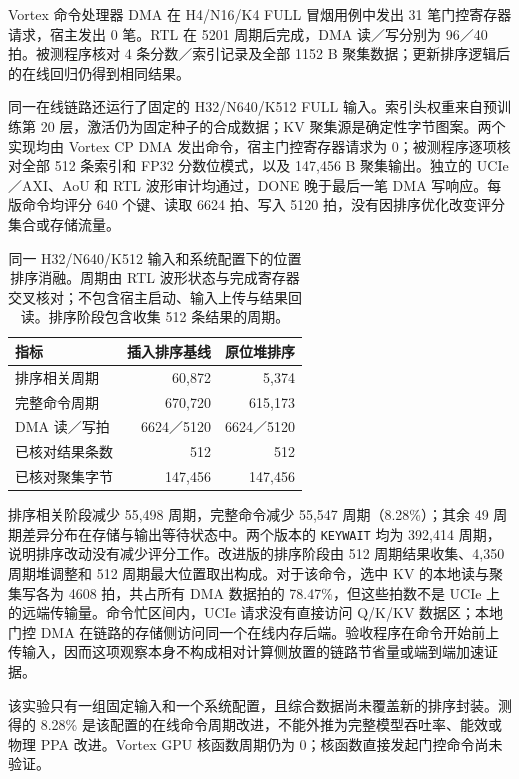 Vortex 命令处理器 DMA 在 H4/N16/K4 FULL 冒烟用例中发出 31 笔门控寄存器请求，宿主发出 0 笔。RTL 在 5201 周期后完成，DMA 读／写分别为 96／40 拍。被测程序核对 4 条分数／索引记录及全部 1152 B 聚集数据；更新排序逻辑后的在线回归仍得到相同结果。

同一在线链路还运行了固定的 H32/N640/K512 FULL 输入。索引头权重来自预训练第 20 层，激活仍为固定种子的合成数据；KV 聚集源是确定性字节图案。两个实现均由 Vortex CP DMA 发出命令，宿主门控寄存器请求为 0；被测程序逐项核对全部 512 条索引和 FP32 分数位模式，以及 147,456 B 聚集输出。独立的 UCIe／AXI、AoU 和 RTL 波形审计均通过，DONE 晚于最后一笔 DMA 写响应。每版命令均评分 640 个键、读取 6624 拍、写入 5120 拍，没有因排序优化改变评分集合或存储流量。

\begin{table}[t]
\centering
\caption{同一 H32/N640/K512 输入和系统配置下的位置排序消融。周期由 RTL 波形状态与完成寄存器交叉核对；不包含宿主启动、输入上传与结果回读。排序阶段包含收集 512 条结果的周期。}
\label{tab:sort_ablation}
\small
\begin{tabular}{lrr}\toprule
指标 & 插入排序基线 & 原位堆排序\\\midrule
排序相关周期 & 60,872 & 5,374\\
完整命令周期 & 670,720 & 615,173\\
DMA 读／写拍 & 6624／5120 & 6624／5120\\
已核对结果条数 & 512 & 512\\
已核对聚集字节 & 147,456 & 147,456\\\bottomrule
\end{tabular}
\end{table}

排序相关阶段减少 55,498 周期，完整命令减少 55,547 周期（8.28\%）；其余 49 周期差异分布在存储与输出等待状态中。两个版本的 \texttt{KEYWAIT} 均为 392,414 周期，说明排序改动没有减少评分工作。改进版的排序阶段由 512 周期结果收集、4,350 周期堆调整和 512 周期最大位置取出构成。对于该命令，选中 KV 的本地读与聚集写各为 4608 拍，共占所有 DMA 数据拍的 78.47\%，但这些拍数不是 UCIe 上的远端传输量。命令忙区间内，UCIe 请求没有直接访问 Q/K/KV 数据区；本地门控 DMA 在链路的存储侧访问同一个在线内存后端。验收程序在命令开始前上传输入，因而这项观察本身不构成相对计算侧放置的链路节省量或端到端加速证据。

该实验只有一组固定输入和一个系统配置，且综合数据尚未覆盖新的排序封装。测得的 8.28\% 是该配置的在线命令周期改进，不能外推为完整模型吞吐率、能效或物理 PPA 改进。Vortex GPU 核函数周期仍为 0；核函数直接发起门控命令尚未验证。
